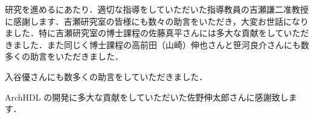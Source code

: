 研究を進めるにあたり．適切な指導をしていただいた指導教員の吉瀬謙二准教授に感謝します．吉瀬研究室の皆様にも数々の助言をいただき，大変お世話になりました．特に吉瀬研究室の博士課程の佐藤真平さんには多大な貢献をしていただきました．また同じく博士課程の高前田（山崎）伸也さんと笹河良介さんにも数多くの助言をいただきました．

入谷優さんにも数多くの助言をしていただきました．

ArchHDL の開発に多大な貢献をしていただいた佐野伸太郎さんに感謝致します．
